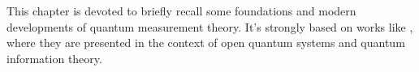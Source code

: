 
This chapter is devoted to briefly recall some
foundations and modern developments of quantum measurement theory.
It's strongly based on works like
\cite{PreskillNotes, Haroche_Exploring, Nakahara, NielsenChuang, open_systems},
where they are presented in the context of
open quantum systems and quantum information theory.
